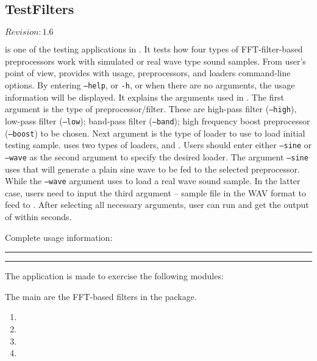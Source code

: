 \subsection{TestFilters}

$Revision: 1.6 $

 is one of the testing applications in {\marf}. It tests how four types of
FFT-filter-based preprocessors work with simulated or real wave type sound samples.
From user's point of view,  provides with usage, preprocessors, and loaders
command-line options.
By entering \texttt{--help}, or \texttt{-h}, or
when there are no arguments, the usage information will be displayed.
It explains the arguments used in . The first argument is the type of
preprocessor/filter. These are high-pass filter (\texttt{--high}), low-pass filter (\texttt{--low});
band-pass filter (\texttt{--band}); high frequency boost preprocessor (\texttt{--boost})
to be chosen. Next argument is the type of loader to use to load initial testing sample.
 uses two types of
loaders,  and .
Users should enter either \texttt{--sine} or \texttt{--wave} as the second argument
to specify the desired loader. The argument \texttt{--sine} uses 
that will generate a plain sine wave to be fed to the selected preprocessor.
While the \texttt{--wave} argument uses  to load a
real wave sound sample. In the latter case, users need to input the third argument --
sample file in the WAV format to feed to
. After selecting all necessary arguments, user can run and get the output of
 within seconds.

\noindent
Complete usage information:

\vspace{15pt}
\hrule

\hrule
\vspace{15pt}

The application is made to exercise the following {\marf} modules:

The main are the FFT-based filters in the
 package.

\begin{enumerate}
\item
{}
\item
{}
\item
{}
\item
{}
\end{enumerate}

